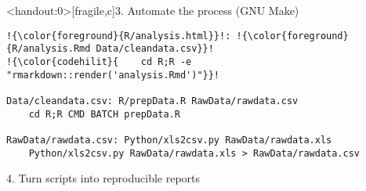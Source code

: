 \documentclass[12pt,t]{beamer}
\begin{document}
\begin{frame}<handout:0>[fragile,c]{3. Automate the process (GNU Make)}

\addtocounter{framenumber}{-1}

\begin{center}
\begin{minipage}[c]{10.8cm}
\begin{semiverbatim}
\begin{lstlisting}[escapechar=!,linewidth=10.8cm]
!{\color{foreground}{R/analysis.html}}!: !{\color{foreground}{R/analysis.Rmd Data/cleandata.csv}}!
!{\color{codehilit}{    cd R;R -e "rmarkdown::render('analysis.Rmd')"}}!

Data/cleandata.csv: R/prepData.R RawData/rawdata.csv
    cd R;R CMD BATCH prepData.R

RawData/rawdata.csv: Python/xls2csv.py RawData/rawdata.xls
    Python/xls2csv.py RawData/rawdata.xls > RawData/rawdata.csv
\end{lstlisting}
\end{semiverbatim}
\end{minipage}
\end{center}
\end{frame}





\begin{frame}[c]{4. Turn scripts into reproducible reports}


\vspace*{8mm}


\end{frame}
\end{document}
